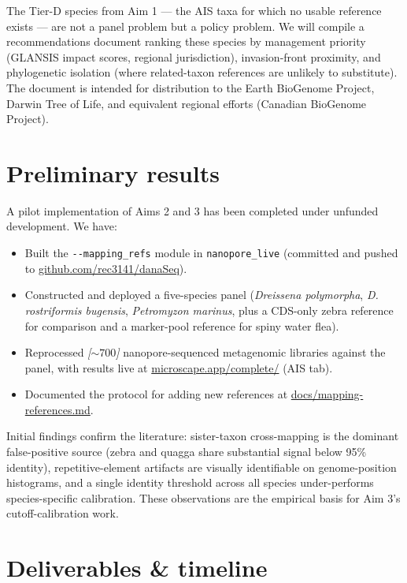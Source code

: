 \documentclass[11pt, letterpaper]{article}
\newcommand{\placeholder}[1]{\textcolor{mutedgray}{\textit{[#1]}}}
\begin{document}
The Tier-D species from Aim 1 --- the AIS taxa for which no usable reference exists --- are not a panel problem but a policy problem. We will compile a recommendations document ranking these species by management priority (GLANSIS impact scores, regional jurisdiction), invasion-front proximity, and phylogenetic isolation (where related-taxon references are unlikely to substitute). The document is intended for distribution to the Earth BioGenome Project, Darwin Tree of Life, and equivalent regional efforts (Canadian BioGenome Project).

\section{Preliminary results}

A pilot implementation of Aims 2 and 3 has been completed under unfunded development. We have:

\begin{itemize}[leftmargin=1.5em]
  \item Built the \texttt{-{}-mapping\_refs} module in \texttt{nanopore\_live} (committed and pushed to \href{https://github.com/rec3141/danaSeq}{github.com/rec3141/danaSeq}).
  \item Constructed and deployed a five-species panel (\textit{Dreissena polymorpha}, \textit{D. rostriformis bugensis}, \textit{Petromyzon marinus}, plus a CDS-only zebra reference for comparison and a marker-pool reference for spiny water flea).
  \item Reprocessed \placeholder{$\sim 700$} nanopore-sequenced metagenomic libraries against the panel, with results live at \href{https://microscape.app/complete/}{microscape.app/complete/} (AIS tab).
  \item Documented the protocol for adding new references at \href{https://github.com/rec3141/danaSeq/blob/main/docs/mapping-references.md}{docs/mapping-references.md}.
\end{itemize}

Initial findings confirm the literature: sister-taxon cross-mapping is the dominant false-positive source (zebra and quagga share substantial signal below 95\% identity), repetitive-element artifacts are visually identifiable on genome-position histograms, and a single identity threshold across all species under-performs species-specific calibration. These observations are the empirical basis for Aim 3's cutoff-calibration work.

\section{Deliverables \& timeline}
\end{document}
